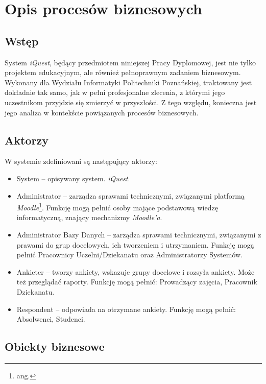 \chapter{Opis procesów biznesowych}
\label{Chapter2}

\section{Wstęp}
\label{Chapter21}

System \textit{iQuest}, będący przedmiotem niniejszej Pracy Dyplomowej, jest nie tylko projektem edukacyjnym, ale również pełnoprawnym zadaniem biznesowym. Wykonany dla Wydziału Informatyki Politechniki Poznańskiej, traktowany jest dokładnie tak samo, jak w pełni profesjonalne zlecenia, z którymi jego uczestnikom przyjdzie się zmierzyć w przyszłości. Z tego względu, konieczna jest jego analiza w kontekście powiązanych procesów biznesowych.

\section{Aktorzy}
\label{Chapter22}

W systemie zdefiniowani są następujący aktorzy:
\begin{itemize}
\item System -- opisywany system. \textit{iQuest}.
\item Administrator -- zarządza sprawami technicznymi, związanymi platformą \textit{Moodle}\footnote{ang. }. Funkcję mogą pełnić osoby mające podstawową wiedzę informatyczną, znający mechanizmy \textit{Moodle'a}.
\item Administrator Bazy Danych -- zarządza sprawami technicznymi, związanymi z prawami do grup docelowych, ich tworzeniem i utrzymaniem. Funkcję mogą pełnić Pracownicy Uczelni\slash Dziekanatu oraz Administratorzy Systemów.
\item Ankieter -- tworzy ankiety, wskazuje grupy docelowe i rozsyła ankiety. Może też przeglądać raporty. Funkcję mogą pełnić: Prowadzący zajęcia, Pracownik Dziekanatu.
\item Respondent -- odpowiada na otrzymane ankiety. Funkcję mogą pełnić: Absolwenci, Studenci.
\end{itemize}

\section{Obiekty biznesowe}
\label{Chapter23}


